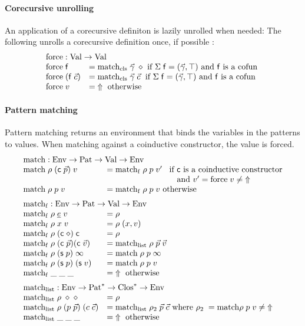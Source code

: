 \paragraph*{Corecursive unrolling}
An application of a corecursive definiton is lazily unrolled when needed: 
The following unrolls a corecursive definition once, if possible :
\[
\begin{array}{ll}
\multicolumn{2}{l}{\forc : \Val \ra \Val }\\
\forc \; \ff & = \matchcls \; \vec{\gamma} \; \diamond \mbox{ if } \Sig \; \ff = (\vec{\gamma},\top) \mbox{ and } \ff \mbox { is a } \cofun \\
\forc \; (\ff \; \vec{c}) & = \matchcls \; \vec{\gamma} \; \vec{c} \; \mbox{ if } \Sig \; \ff = (\vec{\gamma},\top) \mbox { and } \ff \mbox { is a } \cofun\\ 
\forc \; v & = \stuck \mbox{ otherwise}
\end{array}
\]


\paragraph*{Pattern matching}
Pattern matching returns an environment that binds the variables in the patterns to values.
When matching against a coinductive constructor, the value is forced.
\[
\begin{array}{ll}
\multicolumn{2}{l}{\match : \Env \ra \Pat \ra \Val \ra \Env}\\
\match \; \rho \; (\cc \; \vec{p}) \; v & = \matchf \; \rho \; p \; v' \spc \mbox{if  } \cc  \mbox{ is a coinductive constructor}\\
& \spcx \spcx \spcx \mbox{and } v' = \forc \; v \neq \stuck \\
\match \; \rho \; p \; v & = \matchf \; \rho \; p \; v \mbox{ otherwise}
\vs\\
\multicolumn{2}{l}{\matchf : \Env \ra \Pat \ra \Val \ra \Env}\\
\matchf \; \rho \; \inacc{e} \; v & = \rho \\
\matchf \; \rho \; x \; v & = \ins \rho \; (x,v) \\
\matchf \; \rho \; (\cc \; \diamond) \; \cc & = \rho \\
\matchf \; \rho \; (\cc \; \vec{p}) (\cc \; \vec{v}) & = \matchList \; \rho \; \vec{p} \; \vec{v} \\
\matchf \; \rho \; (\s p) \; \infty & = \match \; \rho \; p \; \infty \\
\matchf \; \rho \; (\s p) \; (\s v) & = \match \; \rho \; p \; v \\
\matchf \; \_ \; \_ \; \_ & = \stuck \mbox{ otherwise}
\vs\\
\multicolumn{2}{l}{\matchList : \Env \ra \ves{\Pat} \ra \ves{\Clos} \ra \Env }\\
\matchList \; \rho \; \diamond \; \diamond & = \rho \\
\matchList \; \rho \; (p \; \vec{p}) \; (c \; \vec{c}) & = \matchList \; \rho_2 \; \vec{p} \; \vec{c} \mbox{ where } \rho_2 \; = \match \rho \; p \; v \neq \stuck \\
\matchList \; \_ \; \_ \; \_ & = \stuck \mbox { otherwise } \\
\end{array}
\]

